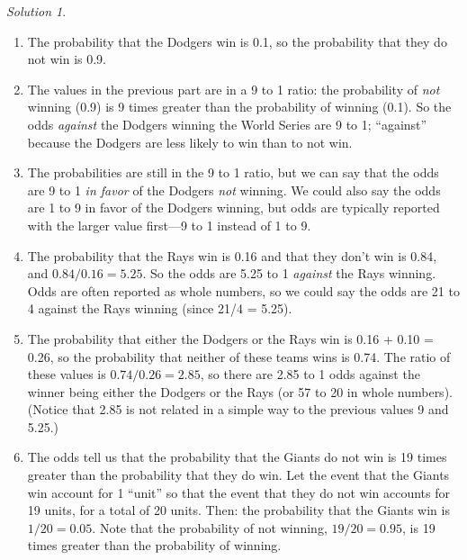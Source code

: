 \documentclass[
  letterpaper,
  DIV=11,
  numbers=noendperiod]{scrreprt}
\providecommand{\tightlist}{%
  \setlength{\itemsep}{0pt}\setlength{\parskip}{0pt}}
\theoremstyle{plain}
\theoremstyle{definition}
\theoremstyle{definition}
\theoremstyle{definition}
\theoremstyle{remark}
\newtheorem{refsolution}{Solution}[chapter]
\begin{document}
\begin{tcolorbox}[enhanced jigsaw, opacityback=0, rightrule=.15mm, coltitle=black, colframe=quarto-callout-tip-color-frame, toprule=.15mm, colbacktitle=quarto-callout-tip-color!10!white, opacitybacktitle=0.6, left=2mm, toptitle=1mm, breakable, title={Solution (click to expand)}, bottomtitle=1mm, colback=white, leftrule=.75mm, titlerule=0mm, arc=.35mm, bottomrule=.15mm]

\begin{refsolution}
\leavevmode

\begin{enumerate}
\def\labelenumi{\arabic{enumi}.}
\tightlist
\item
  The probability that the Dodgers win is 0.1, so the probability that
  they do not win is 0.9.
\item
  The values in the previous part are in a 9 to 1 ratio: the probability
  of \emph{not} winning (0.9) is 9 times greater than the probability of
  winning (0.1). So the odds \emph{against} the Dodgers winning the
  World Series are 9 to 1; ``against'' because the Dodgers are less
  likely to win than to not win.
\item
  The probabilities are still in the 9 to 1 ratio, but we can say that
  the odds are 9 to 1 \emph{in favor} of the Dodgers \emph{not} winning.
  We could also say the odds are 1 to 9 in favor of the Dodgers winning,
  but odds are typically reported with the larger value first---9 to 1
  instead of 1 to 9.
\item
  The probability that the Rays win is 0.16 and that they don't win is
  0.84, and \(0.84/0.16 = 5.25\). So the odds are 5.25 to 1
  \emph{against} the Rays winning. Odds are often reported as whole
  numbers, so we could say the odds are 21 to 4 against the Rays winning
  (since 21/4 = 5.25).
\item
  The probability that either the Dodgers or the Rays win is 0.16 + 0.10
  = 0.26, so the probability that neither of these teams wins is 0.74.
  The ratio of these values is \(0.74/0.26 = 2.85\), so there are 2.85
  to 1 odds against the winner being either the Dodgers or the Rays (or
  57 to 20 in whole numbers). (Notice that 2.85 is not related in a
  simple way to the previous values 9 and 5.25.)
\item
  The odds tell us that the probability that the Giants do not win is 19
  times greater than the probability that they do win. Let the event
  that the Giants win account for 1 ``unit'' so that the event that they
  do not win accounts for 19 units, for a total of 20 units.
  Then\footnotemark{}: the probability that the Giants win is
  \(1/20 = 0.05\). Note that the probability of not winning,
  \(19/20 = 0.95\), is 19 times greater than the probability of winning.
\end{enumerate}

\label{sol-worldseries-odds}

\end{refsolution}

\end{tcolorbox}
\end{document}
